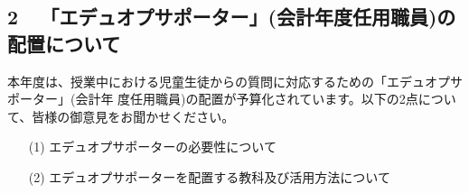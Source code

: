 \documentclass[12pt,jafontscale=0.9247]{jlreq}
\begin{document}
\newpage

\subsection*{2\,\,\,\,\,\,\,\<「エデュオプサポーター」(会計年度任用職員)の配置について}
 本年度は、授業中における児童生徒からの質問に対応するための「エデュオプサポーター」(会計年
度任用職員)の配置が予算化されています。以下の2点について、皆様の御意見をお聞かせください。

\begin{itemize}
 \item[(1)] エデュオプサポーターの必要性について
 \item[(2)] エデュオプサポーターを配置する教科及び活用方法について
\end{itemize}
\end{document}
